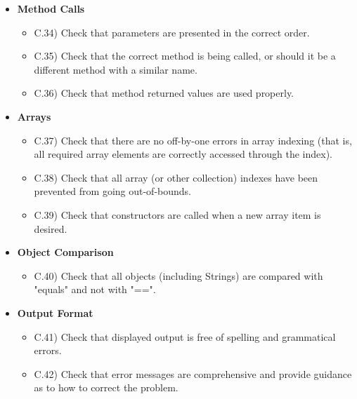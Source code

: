 \documentclass[../../codeInspection.tex]{subfiles}
\begin{document}
\begin{itemize}
\begin{itemize}
						\end{itemize}

				\item 	\textbf{Method Calls}
						\begin{itemize}

							\item C.34) Check that parameters are presented in the correct order.

							\item C.35) Check that the correct method is being called, or should it be a different method with a similar name.

							\item C.36) Check that method returned values are used properly.

						\end{itemize}

				\item 	\textbf{Arrays}
						\begin{itemize}

							\item C.37) Check that there are no off-by-one errors in array indexing (that is, all required array elements are correctly accessed through the index).

							\item C.38) Check that all array (or other collection) indexes have been prevented from going out-of-bounds.

							\item C.39) Check that constructors are called when a new array item is desired.

						\end{itemize}

				\item 	\textbf{Object Comparison}
						\begin{itemize}

							\item C.40) Check that all objects (including Strings) are compared with "equals" and not with "==".

						\end{itemize}

				\item 	\textbf{Output Format}
						\begin{itemize}

							\item C.41) Check that displayed output is free of spelling and grammatical errors.

							\item C.42) Check that error messages are comprehensive and provide guidance as to how to correct the problem.


\end{itemize}
\end{itemize}
\end{document}

